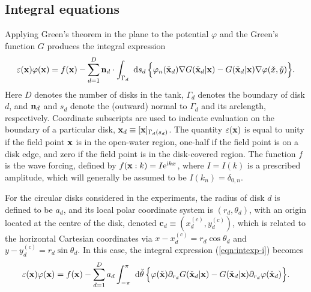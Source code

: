 \documentclass[12pt,a4paper]{article}
\newcommand{\vph}{{\varphi}}
\newcommand{\nm}{{\bf n}}
\newcommand{\bdy}{\Gamma}
\newcommand{\rad}{a}
\newcommand{\xo}{\check{x}}
\newcommand{\yo}{\check{y}}
\newcommand{\bx}{{\bf x}}
\newcommand{\bxo}{\check{\textbf{x}}}
\newcommand{\tho}{\check{\theta}}
\newcommand{\force}{f}
\newcommand{\cent}{\textbf{c}}
\begin{document}

\subsection{Integral equations}

Applying Green's theorem in the plane to the potential $\vph$ and the Green's function $G$ produces the integral expression
\begin{equation}\label{eqn:intexp-i}
\eps(\bx)\vph(\bx)
=
\ds
\force(\bx)
-
\sum_{d=1}^{D}
\nm_{d}\cdot
\int_{\bdy_{d}}\wrt s_{d} \,
\Big\{
\vph_{n}(\bxo_{d})
\bnab
G(\bxo_{d}\vert \bx)
-
G(\bxo_{d}\vert \bx)
\bnab
\vph(\xo,\yo)
\Big\}
.
\end{equation}
Here $D$ denotes the number of disks in the tank, $\bdy_{d}$ denotes the  boundary of disk $d$, and $\nm_{d}$ and $s_{d}$ denote the (outward) normal to $\bdy_{d}$ and its arclength, respectively.
Coordinate subscripts are used to  indicate evaluation on the boundary of a particular disk, \ie $\bx_{d}\equiv[\bx ]_{\bdy_{d}(s_{d})}$.
The quantity $\eps(\bx)$ is equal to unity if the field point $\bx$ is in the open-water region, one-half if the field point is on a disk edge, and zero if the field point is in the disk-covered region.
The function $\force$ is the wave forcing, defined by 
$\force(\bx:k)=I\exp^{\ci kx}$, where $I=I(k)$ is a prescribed amplitude, which will generally be assumed to be $I(k_{n})=\delta_{0,n}$.

For the circular disks considered in the experiments,  the radius of disk $d$ is defined to be $\rad_{d}$, and its local polar coordinate system is $(r_{d},\theta_{d})$, with an origin located at the centre of the disk, denoted %
$\cent_{d}\equiv (x_{d}^{(c)},y_{d}^{(c)})$, which is related to the horizontal Cartesian coordinates via $x-x_{d}^{(c)}=r_{d}\cos\theta_{d}$ and $y-y_{d}^{(c)}=r_{d}\sin\theta_{d}$.
In this case, the integral expression (\ref{eqn:intexp-i}) becomes
\begin{equation}\label{eqn:intexp_ii}
\eps(\bx)\vph(\bx)
=
\force(\bx)
-
\sum_{d=1}^{D}
\rad_{d}
\int_{-\pi}^{\pi}\wrt \tho \,
\Big\{
\vph(\bxo)
\partial_{r_{d}}
G(\bxo_{d}\vert \bx)
-
G(\bxo_{d}\vert \bx)
\partial_{r_{d}}
\vph(\bxo_{d})
\Big\}
.
\end{equation}
\end{document}
